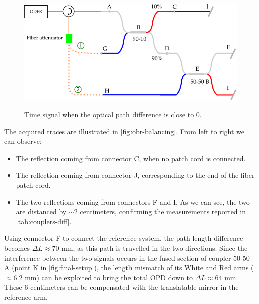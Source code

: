 \begin{figure}[hbt]
	\myfloatalign
	{	\includegraphics[width=\linewidth]{gfx/ch3/obr-balancing-setup}}
	\caption{Time signal when the optical path difference is close to 0.}\label{fig:obr-balancing-setup}
\end{figure}

The acquired traces are illustrated in \autoref{fig:obr-balancing}. From left to right we can observe:
\begin{itemize}
	
	\item The reflection coming from connector C, when no patch cord is connected.
	\item The reflection coming from connector J, corresponding to the end of the fiber patch cord. 
	
	\item The two reflections coming from connectors F and I. As we can see, the two are distanced by $\sim 2$ centimeters, confirming the measurements reported in \autoref{tab:couplers-diff}. 
\end{itemize}

Using connector F to connect the reference system, the path length difference becomes $\Delta L \approx 70$ mm, as this path is travelled in the two directions. Since the interference between the two signals occurs in the fused section of coupler 50-50 A (point K in \autoref{fig:final-setup}), the length mismatch of its White and Red arms ($\approx 6.2$ mm) can be exploited to bring the total \ac{OPD} down to $\Delta L \approx 64$ mm. These 6 centimeters can be compensated with the translatable mirror in the reference arm. 


